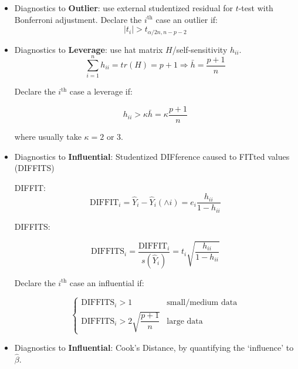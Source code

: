 \begin{itemize}[topsep=2pt,itemsep=0pt]
    \item Diagnostics to \textbf{Outlier}: use external studentized residual for $ t $-test with Bonferroni adjustment. Declare the $ i^\mathrm{th} $ case an outlier if: 
    \begin{equation}
         |t_i|>t_{\alpha/2n,n-p-2}
    \end{equation}
    \item Diagnostics to \textbf{Leverage}: use hat matrix $ H $/self-sensitivity $ h_{ii} $.
    \begin{equation}
        \sum_{i=1}^n h_{ii}=tr(H)=p+1 \Rightarrow \bar{h}=\dfrac{p+1}{n} 
    \end{equation}
    
    Declare the $ i^\mathrm{th}  $ case a {leverage} if:
    
    \begin{equation}
        h_{ii}>\kappa \bar{h}=\kappa \dfrac{p+1}{n} 
    \end{equation}
    
    where usually take $ \kappa =2 $ or $ 3 $.
    \item Diagnostics to \textbf{Influential}: Studentized DIFference caused to FITted values (DIFFITS)
    
    DIFFIT:
    \begin{equation}
        \mathrm{DIFFIT}_i=\hat{Y}_i-\hat{Y}_i(\wedge i)=e_i\dfrac{h_{ii}}{1-h_{ii}} 
    \end{equation}

    DIFFITS:
    
    \begin{equation}
        \mathrm{DIFFITS}_i=\dfrac{\mathrm{DIFFIT}_i}{s(\hat{Y}_i)}=t_i\sqrt{\dfrac{h_{ii}}{1-h_{ii}}}
    \end{equation}
    
    Declare the $ i^\mathrm{th}  $ case an {influential} if:
    
    \begin{equation}
        \begin{cases}
            \mathrm{DIFFITS}_i>1&\text{small/medium data} \\
            \mathrm{DIFFITS}_i>2\sqrt{\dfrac{p+1}{n}}&\text{large data}
        \end{cases}   
    \end{equation}
    
    \item Diagnostics to \textbf{Influential}: Cook's Distance, by quantifying the `influence' to $ \hat{\beta } $.
    

\end{itemize}
